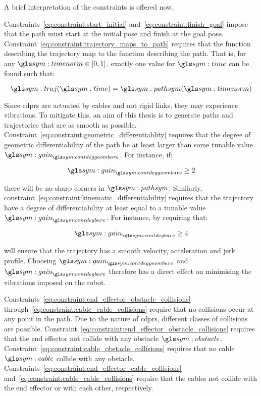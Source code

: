 	A brief interpretation of the constraints is offered now.

	Constraints~\ref{eq:constraint:start_initial}
	and~\ref{eq:constraint:finish_goal} impose that the path must start at the
	initial pose and finish at the goal pose.
	Constraint~\ref{eq:constraint:trajectory_maps_to_path} requires that the
	function describing the trajectory map to the function describing the path.
	That is, for any $\timenorm \in [0, 1]$, exactly one value for $\timesym$
	can be found such that:

	\begin{equation}
		\traj(\timesym) = \pathsym(\timenorm)
	\end{equation}

	Since \glspl{cdpr} are actuated by cables and not rigid links, they may
	experience vibrations. To mitigate this, an aim of
	this thesis is to generate paths and trajectories that are as smooth as
	possible. Constraint~\ref{eq:constraint:geometric_differentiablity} requires
	that the degree of geometric differentiability of the path be at least
	larger than some tunable value $\gain_{\contdeggeombare}$. For instance, if:

	\begin{equation}
		\gain_{\contdeggeombare} \geq 2
	\end{equation}

	there will be no sharp corners in $\pathsym$. Similarly,
	constraint~\ref{eq:constraint:kinematic_differentiability} requires that the
	trajectory have a degree of differentiability at least equal to a tunable
	value $\gain_{\contdegbare}$. For instance, by requiring that:

	\begin{equation}
		\gain_{\contdegbare} \geq 4
	\end{equation}

	will ensure that the trajectory has a smooth velocity, acceleration and jerk
	profile. Choosing $\gain_{\contdeggeombare}$ and $\gain_{\contdegbare}$
	therefore has a direct effect on minimising the vibrations imposed on the
	robot.

	Constraints~\ref{eq:constraint:end_effector_obstacle_collisions}
	through~\ref{eq:constraint:cable_cable_collisions} require that no
	collisions occur at any point in the path. Due to the nature of
	\glspl{cdpr}, different classes of collisions are possible.
	Constraint~\ref{eq:constraint:end_effector_obstacle_collisions} requires
	that the end effector not collide with any obstacle $\obstacle$.
	Constraint~\ref{eq:constraint:cable_obstacle_collisions} requires that no
	cable $\cable$ collide with any obstacle.
	Constraints~\ref{eq:constraint:end_effector_cable_collisions}
	and~\ref{eq:constraint:cable_cable_collisions} require that the cables not
	collide with the end effector or with each other, respectively.

